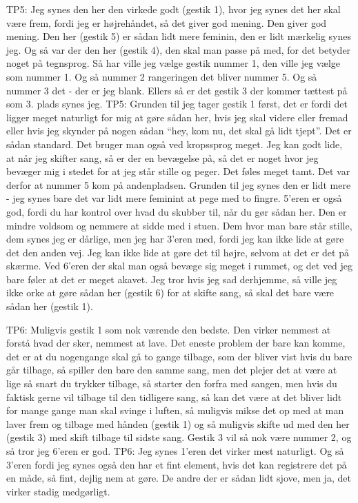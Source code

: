 TP5: Jeg synes den her den virkede godt (gestik 1), hvor jeg synes det her skal være frem, fordi jeg er højrehåndet, så det giver god mening. Den giver god mening. Den her (gestik 5) er sådan lidt mere feminin, den er lidt mærkelig synes jeg. Og så var der den her (gestik 4), den skal man passe på med, for det betyder noget på tegnsprog. Så har ville jeg vælge gestik nummer 1, den ville jeg vælge som nummer 1. Og så nummer 2 rangeringen det bliver nummer 5. Og så nummer 3 det - der er jeg blank. Ellers så er det gestik 3 der kommer tættest på som 3. plads synes jeg.
TP5: Grunden til jeg tager gestik 1 først, det er fordi det ligger meget naturligt for mig at gøre sådan her, hvis jeg skal videre eller fremad eller hvis jeg skynder på nogen sådan “hey, kom nu, det skal gå lidt tjept”. Det er sådan standard. Det bruger man også ved kropssprog meget. Jeg kan godt lide, at når jeg skifter sang, så er der en bevægelse på, så det er noget hvor jeg bevæger mig i stedet for at jeg står stille og peger. Det føles meget tamt. Det var derfor at nummer 5 kom på andenpladsen. Grunden til jeg synes den er lidt mere - jeg synes bare det var lidt mere feminint at pege med to fingre. 5’eren er også god, fordi du har kontrol over hvad du skubber til, når du gør sådan her. Den er mindre voldsom og nemmere at sidde med i stuen. Dem hvor man bare står stille, dem synes jeg er dårlige, men jeg har 3’eren med, fordi jeg kan ikke lide at gøre det den anden vej. Jeg kan ikke lide at gøre det til højre, selvom at det er det på skærme. Ved 6’eren der skal man også bevæge sig meget i rummet, og det ved jeg bare føler at det er meget akavet. Jeg tror hvis jeg sad derhjemme, så ville jeg ikke orke at gøre sådan her (gestik 6) for at skifte sang, så skal det bare være sådan her (gestik 1).
 

TP6: Muligvis gestik 1 som nok værende den bedste. Den virker nemmest at forstå hvad der sker, nemmest at lave. Det eneste problem der bare kan komme, det er at du nogengange skal gå to gange tilbage, som der bliver vist hvis du bare går tilbage, så spiller den bare den samme sang, men det plejer det at være at lige så snart du trykker tilbage, så starter den forfra med sangen, men hvis du faktisk gerne vil tilbage til den tidligere sang, så kan det være at det bliver lidt for mange gange man skal svinge i luften, så muligvis mikse det op med at man laver frem og tilbage med hånden (gestik 1) og så muligvis skifte ud med den her (gestik 3) med skift tilbage til sidste sang. Gestik 3 vil så nok være nummer 2, og så tror jeg 6’eren er god. 
TP6: Jeg synes 1’eren det virker mest naturligt. Og så 3’eren fordi jeg synes også den har et fint element, hvis det kan registrere det på en måde, så fint, dejlig nem at gøre. De andre der er sådan lidt sjove, men ja, det virker stadig medgørligt. 


